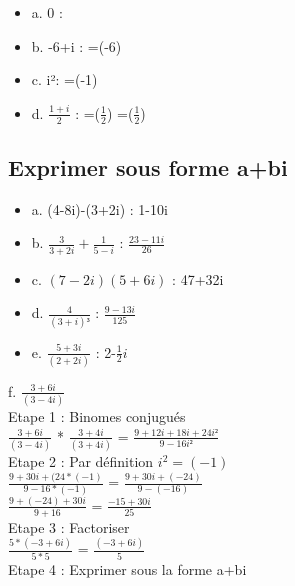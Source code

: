 \begin{itemize}
\item {a. 0 :   }
\item {b. -6+i : \R=(-6) }
\item {c. i²: \R=(-1) }
\item {d. $\frac{1+i}{2}$ : \R=($\frac{1}{2}$) \I=($\frac{1}{2}$)}
\end{itemize}


\vspace{3mm} %
\subsection{Exprimer sous forme a+bi}
\vspace{3mm} %

\begin{itemize}
\item {a. (4-8i)-(3+2i) : 1-10i}
\item {b. $\frac{3}{3+2i} + \frac{1}{5-i}$ : $\frac{23-11i}{26}$}
\item {c. $(7-2i)(5+6i)$ : 47+32i}
\item {d. $\frac{4}{(3+i)³}$ : $\frac{9-13i}{125}$}
\item {e. $\frac{5+3i}{(2+2i)}$ : 2-$\frac{1}{2}i$}
\end{itemize}
\vspace{8mm} %

f. $\frac{3+6i}{(3-4i)} $ \\

Etape 1 : Binomes conjugués \\

$\frac{3+6i}{(3-4i)}$ * $\frac{3+4i}{(3+4i)}$ = $\frac{9+12i+18i+24i²}{9-16i²}$ \\

Etape 2 : Par définition $i^{2} = (-1)$ \\

$\frac{9+30i+(24*(-1)}{9-16*(-1)}$  = $\frac{9+30i+(-24)}{9-(-16)}$ \\

$\frac{9+(-24)+30i}{9+16}$  = $\frac{-15+30i}{25}$ \\

Etape 3 : Factoriser \\

$\frac{5*(-3+6i)}{5*5}$ = $\frac{(-3+6i)}{5}$ \\

Etape 4 : Exprimer sous la forme a+bi \\

